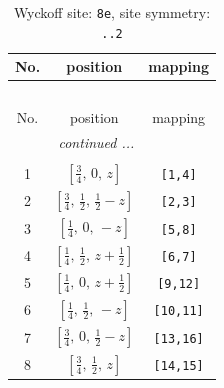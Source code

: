 \documentclass[fleqn,8pt]{jsarticle}
\begin{document}
\renewcommand{\arraystretch}{1.2}
\begin{longtable}{ccc}
\caption{Wyckoff site: {\tt 8e}, site symmetry: {\tt ..2}}
 \\
 \hline \hline
No. & position & mapping \\ \hline \endfirsthead

\multicolumn{2}{l}{\tablename\ \thetable{}} \\
 \hline \hline
No. & position & mapping \\ \hline \endhead

 \hline \hline
\multicolumn{2}{r}{\footnotesize\it continued ...} \\ \endfoot

 \hline \hline
\multicolumn{2}{r}{} \\ \endlastfoot

1 & $\left[ \frac{3}{4},\, 0,\, z \right]$ & {\tt [1,4]} \\ \hline
2 & $\left[ \frac{3}{4},\, \frac{1}{2},\, \frac{1}{2} - z \right]$ & {\tt [2,3]} \\ \hline
3 & $\left[ \frac{1}{4},\, 0,\, - z \right]$ & {\tt [5,8]} \\ \hline
4 & $\left[ \frac{1}{4},\, \frac{1}{2},\, z + \frac{1}{2} \right]$ & {\tt [6,7]} \\ \hline
5 & $\left[ \frac{1}{4},\, 0,\, z + \frac{1}{2} \right]$ & {\tt [9,12]} \\ \hline
6 & $\left[ \frac{1}{4},\, \frac{1}{2},\, - z \right]$ & {\tt [10,11]} \\ \hline
7 & $\left[ \frac{3}{4},\, 0,\, \frac{1}{2} - z \right]$ & {\tt [13,16]} \\ \hline
8 & $\left[ \frac{3}{4},\, \frac{1}{2},\, z \right]$ & {\tt [14,15]} \\
\end{longtable}
\renewcommand{\arraystretch}{1.2}
\end{document}
